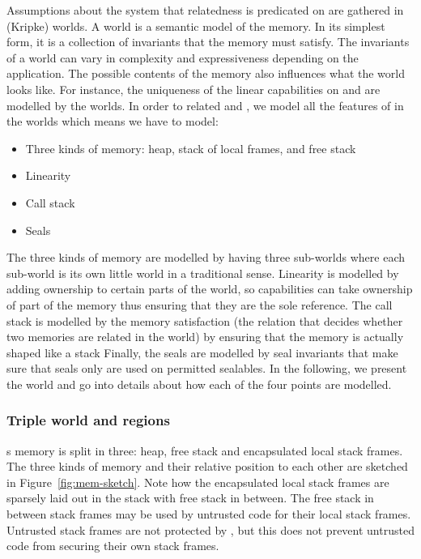 \begin{jversion}
Assumptions about the system that relatedness is predicated on are gathered in (Kripke) worlds.
A world is a semantic model of the memory.
In its simplest form, it is a collection of invariants that the memory must satisfy.
The invariants of a world can vary in complexity and expressiveness depending on the application.
The possible contents of the memory also influences what the world looks like.
For instance, the uniqueness of the linear capabilities on \trgcm{} and \srccm{} are modelled by the worlds.
In order to related \trgcm{} and \srccm{}, we model all the features of \srccm{} in the worlds which means we have to model:
\begin{itemize}
\item Three kinds of memory: heap, stack of local frames, and free stack
\item Linearity
\item Call stack
\item Seals
\end{itemize}
The three kinds of memory are modelled by having three sub-worlds where each sub-world is its own little world in a traditional sense.
Linearity is modelled by adding ownership to certain parts of the world, so capabilities can take ownership of part of the memory thus ensuring that they are the sole reference.
The call stack is modelled by the memory satisfaction (the relation that decides whether two memories are related in the world) by ensuring that the memory is actually shaped like a stack
Finally, the seals are modelled by seal invariants that make sure that seals only are used on permitted sealables.
In the following, we present the world and go into details about how each of the four points are modelled.

\subsubsection{Triple world and regions}
\srccm{}s memory is split in three: heap, free stack and encapsulated local stack frames.
The three kinds of memory and their relative position to each other are sketched in Figure~\ref{fig:mem-sketch}.
Note how the encapsulated local stack frames are sparsely laid out in the stack with free stack in between.
The free stack in between stack frames may be used by untrusted code for their local stack frames.
Untrusted stack frames are not protected by \srccm{}, but this does not prevent untrusted code from securing their own stack frames.
\begin{figure}
  \centering
  \begin{tikzpicture}[scale=.5, every node={scale=.5}]
 

\end{tikzpicture}
\end{figure}
\end{jversion}
